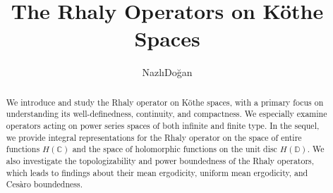 \documentclass{birkjour}
\theoremstyle{definition}
\theoremstyle{remark}
\numberwithin{equation}{section}
\begin{document}
%
%
%
%
%
%
%
%
%


\title[The Rhaly Operators on Köthe Spaces]
 {{The Rhaly Operators on Köthe Spaces}}



\author{Nazl\i\;Do\u{g}an}
\address{Fatih Sultan Mehmet Vak{\i}f University, 
    34445 Istanbul, Turkey}




\begin{abstract} 
We introduce and study the Rhaly operator on Köthe spaces, with a primary focus on understanding its well-definedness, continuity, and compactness. We especially examine operators acting on power series spaces of both infinite and finite type. In the sequel, we provide integral representations for the Rhaly operator on the space of entire functions $H(\mathbb{C})$ and the space of holomorphic functions on the unit disc $H(\mathbb{D})$.
We also investigate the topologizability and power boundedness of the Rhaly operators, which leads to findings about their mean ergodicity, uniform mean ergodicity, and Ces\`{a}ro boundedness.
\end{abstract}

\maketitle
\end{document}
